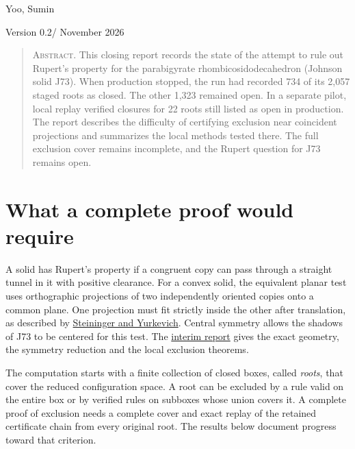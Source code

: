 \documentclass[11pt,a4paper]{amsart}
\newcommand{\releasedate}{November 2026}
\newcommand{\interimpaper}{\href{https://doi.org/10.5281/zenodo.23725007}{interim report}}
\begin{document}
\raggedbottom
\pagestyle{empty}
\thispagestyle{empty}
\begin{center}
  \par
  \par
  \vspace{0.55em}
  Yoo, Sumin\par
  {\small Version 0.2\quad / \quad \releasedate\par}
\end{center}
\begin{quote}
\small\textsc{Abstract.}
This closing report records the state of the attempt to rule out Rupert's
property for the parabigyrate rhombicosidodecahedron (Johnson solid J73).
When production stopped, the run had recorded 734 of its 2,057 staged
roots as closed. The other 1,323 remained open. In a separate pilot,
local replay verified closures for 22 roots still listed as open in
production. The report
describes the difficulty of certifying exclusion near coincident
projections and summarizes the local methods tested there. The full
exclusion cover remains incomplete, and the Rupert question for J73
remains open.
\end{quote}

\section*{What a complete proof would require}

A solid has Rupert's property if a congruent copy can pass through a
straight tunnel in it with positive clearance. For a convex solid, the
equivalent planar test uses orthographic projections of two independently
oriented copies onto a common plane. One projection must fit strictly
inside the other after translation, as described by
\href{https://doi.org/10.1090/mcom/3831}{Steininger and Yurkevich}.
Central symmetry allows the shadows of J73 to be centered for this
test. The \interimpaper{} gives the exact geometry, the symmetry
reduction and the local exclusion theorems.

The computation starts with a finite collection of closed boxes, called
\emph{roots}, that cover the reduced configuration space. A root can be
excluded by a rule valid on the entire box or by verified rules on
subboxes whose union covers it. A complete proof of exclusion needs a
complete cover and exact replay of the retained certificate chain from
every original root. The results below document progress toward that
criterion.
\end{document}
